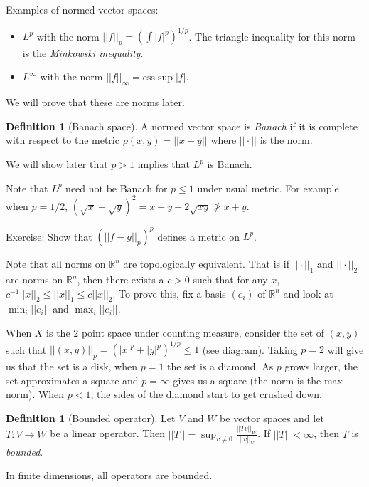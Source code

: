 \documentclass{article}
\theoremstyle{definition}
\newtheorem{definition}[theorem]{Definition}
\begin{document}
Examples of normed vector spaces:
\begin{itemize}
    \item \(L^p\) with the norm \(||f||_p={\left(\int|f|^p \right)}^{1/p}\). The triangle inequality for this norm is
    the \textit{Minkowski inequality}.
    \item \(L^\infty \) with the norm \(||f||_\infty =\text{ess}\sup |f|\).
\end{itemize}
We will prove that these are norms later.

\begin{definition}[Banach space]
    A normed vector space is \textit{Banach} if it is complete with respect to the metric \(\rho(x,y)=||x-y||\) where
    \(||\cdot||\) is the norm.
\end{definition}

We will show later that \(p>1\) implies that \(L^p\) is Banach.

Note that \(L^p\) need not be Banach for \(p\leq 1\) under usual metric. For example when \(p=1/2\),
\({(\sqrt{x}+\sqrt{y})}^2=x+y+2\sqrt{xy}\not\geq x+y\).

Exercise: Show that \({(||f-g||_p)}^p\) defines a metric on \(L^p\).

Note that all norms on \(\mathbb{R}^n\) are topologically equivalent. That is if \(||\cdot||_1\) and \(||\cdot||_2\) are norms
on \(\mathbb{R}^n\), then there exists a \(c>0\) such that for any \(x\), \(c^{-1}||x||_2\leq||x||_1\leq c||x||_2\). To prove
this, fix a basis \((e_i)\) of \(\mathbb{R}^n\) and look at \(\min_i ||e_i||\) and \(\max_i ||e_i||\).

When \(X\) is the 2 point space under counting measure, consider the set of \( (x,y)\) such that
\(||(x,y)||_p={(|x|^p+|y|^p)}^{1/p}\leq 1\) (see diagram). Taking \(p=2\) will give us that the set is a disk, when
\(p=1\) the set is a diamond. As \(p\) grows larger, the set approximates a square and \(p=\infty\) gives us a square
(the norm is the max norm). When \(p<1\), the sides of the diamond start to get crushed down.

\begin{definition}[Bounded operator]
    Let \(V\) and \(W\) be vector spaces and let \(T:V\rightarrow W\) be a linear operator. Then
    \(||T||=\sup_{v\neq 0} \frac{||Tv||_W}{||v||_V}\). If \(||T||<\infty \), then \(T\) is \textit{bounded}.
\end{definition}

In finite dimensions, all operators are bounded.
\end{document}
